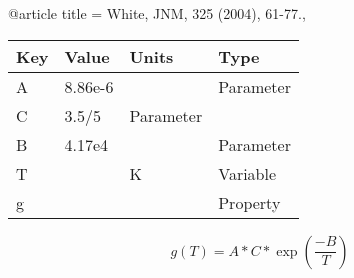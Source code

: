 @article{
title = {White, JNM, 325 (2004), 61-77.},
}

\begin{tabular}{|l|l|l|l|}
    \hline
    Key & Value & Units & Type \\
    \hline
    A & 8.86e-6 &  & Parameter\\
    C & 3.5/5 & Parameter \\
    B & 4.17e4  &  & Parameter \\
    T &   & K    & Variable\\
    g &   &  & Property\\
    \hline
\end{tabular}

\begin{equation}
g(T)=A*C*\exp(\frac{-B}{T})
\end{equation}

